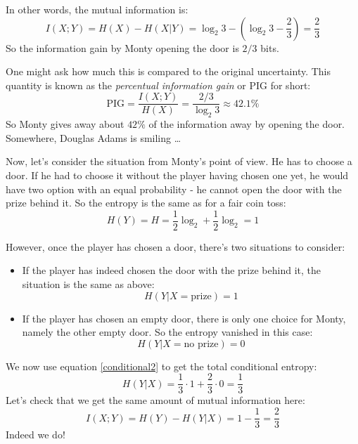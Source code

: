 \documentclass[12pt, a4paper]{article}
\numberwithin{equation}{section}
\begin{document}
In other words, the mutual information is:
\begin{equation}
I(X;Y)=H(X)-H(X|Y)=\log_2 3-\left(\log_2 3-\frac{2}{3}\right)=\frac{2}{3}
\end{equation}
So the information gain by Monty opening the door is $2/3$ bits.

One might ask how much this is compared to the original uncertainty. This quantity is known as the \textit{percentual information gain} or PIG for short:
\begin{equation}
\textrm{PIG}=\frac{I(X;Y)}{H(X)}=\frac{2/3}{\log_2 3}\approx 42.1\%
\end{equation}
So Monty gives away about $42\%$ of the information away by opening the door. Somewhere, Douglas Adams is smiling \ldots

Now, let's consider the situation from Monty's point of view. He has to choose a door. If he had to choose it without the player having chosen one yet, he would have two option with an equal probability - he cannot open the door with the prize behind it. So the entropy is the same as for a fair coin toss:
\begin{equation}
H(Y)=H=\frac{1}{2}\log_2+\frac{1}{2}\log_2=1
\end{equation}

However, once the player has chosen a door, there's two situations to consider:
\begin{itemize}
\item If the player has indeed chosen the door with the prize behind it, the situation is the same as above:
\begin{equation}
H(Y|X=\textrm{prize})=1
\end{equation}
\item If the player has chosen an empty door, there is only one choice for Monty, namely the other empty door. So the entropy vanished in this case:
\begin{equation}
H(Y|X=\textrm{no prize})=0
\end{equation}
\end{itemize}
We now use equation \ref{conditional2} to get the total conditional entropy:
\begin{equation}
H(Y|X)=\frac{1}{3}\cdot 1+\frac{2}{3}\cdot 0=\frac{1}{3}
\end{equation}
Let's check that we get the same amount of mutual information here:
\begin{equation}
I(X;Y)=H(Y)-H(Y|X)=1-\frac{1}{3}=\frac{2}{3}
\end{equation}
Indeed we do!
\end{document}
